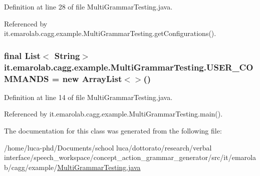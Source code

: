 Definition at line 28 of file Multi\-Grammar\-Testing.\-java.



Referenced by it.\-emarolab.\-cagg.\-example.\-Multi\-Grammar\-Testing.\-get\-Configurations().

\hypertarget{classit_1_1emarolab_1_1cagg_1_1example_1_1MultiGrammarTesting_a6cf319ea31fc0e18d4eb0fa17355f353}{
\subsubsection[{U\-S\-E\-R\-\_\-\-C\-O\-M\-M\-A\-N\-D\-S}]{\setlength{\rightskip}{0pt plus 5cm}final List$<$ String$>$ it.\-emarolab.\-cagg.\-example.\-Multi\-Grammar\-Testing.\-U\-S\-E\-R\-\_\-\-C\-O\-M\-M\-A\-N\-D\-S = new Array\-List$<$$>$()\hspace{0.3cm}{\ttfamily [static]}}}\label{classit_1_1emarolab_1_1cagg_1_1example_1_1MultiGrammarTesting_a6cf319ea31fc0e18d4eb0fa17355f353}


Definition at line 14 of file Multi\-Grammar\-Testing.\-java.



Referenced by it.\-emarolab.\-cagg.\-example.\-Multi\-Grammar\-Testing.\-main().



The documentation for this class was generated from the following file\-:\begin{DoxyCompactItemize}
\item 
/home/luca-\/phd/\-Documents/school luca/dottorato/research/verbal interface/speech\-\_\-workspace/concept\-\_\-action\-\_\-grammar\-\_\-generator/src/it/emarolab/cagg/example/\hyperlink{MultiGrammarTesting_8java}{Multi\-Grammar\-Testing.\-java}\end{DoxyCompactItemize}
